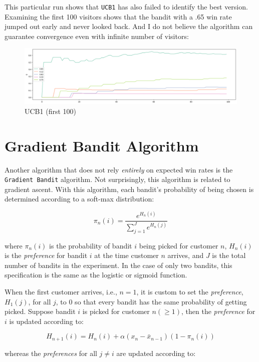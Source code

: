 \documentclass[
]{book}
\theoremstyle{definition}
\theoremstyle{definition}
\theoremstyle{definition}
\theoremstyle{definition}
\theoremstyle{remark}
\begin{document}
This particular run shows that \texttt{UCB1} has also failed to identify the best version. Examining the first 100 visitors shows that the bandit with a .65 win rate jumped out early and never looked back. And I do not believe the algorithm can guarantee convergence even with infinite number of visitors:

\begin{figure}
\centering
\includegraphics{images/ucb1_100.png}
\caption{UCB1 (first 100)}
\end{figure}

\hypertarget{gradient-bandit-algorithm}{%
\section{Gradient Bandit Algorithm}\label{gradient-bandit-algorithm}}

Another algorithm that does not rely \emph{entirely} on expected win rates is the \texttt{Gradient\ Bandit} algorithm. Not surprisingly, this algorithm is related to gradient ascent. With this algorithm, each bandit's probability of being chosen is determined according to a soft-max distribution:

\[\pi_n(i)=\frac{e^{H_n(i)}}{\sum_{j=1}^{J}{e^{H_n(j)}}}\]

where \(\pi_n(i)\) is the probability of bandit \(i\) being picked for customer \(n\), \(H_n(i)\) is the \emph{preference} for bandit \(i\) at the time customer \(n\) arrives, and \(J\) is the total number of bandits in the experiment. In the case of only two bandits, this specification is the same as the logistic or sigmoid function.

When the first customer arrives, i.e., \(n=1\), it is custom to set the \emph{preference}, \(H_1(j)\), for all \(j\), to 0 so that every bandit has the same probability of getting picked. Suppose bandit \(i\) is picked for customer \(n(\geq1)\), then the \emph{preference} for \(i\) is updated according to:

\[H_{n+1}(i)=H_n(i)+\alpha(x_n - \bar{x}_{n-1})(1-\pi_n(i))\]

whereas the \emph{preferences} for all \(j\neq i\) are updated according to:
\end{document}
